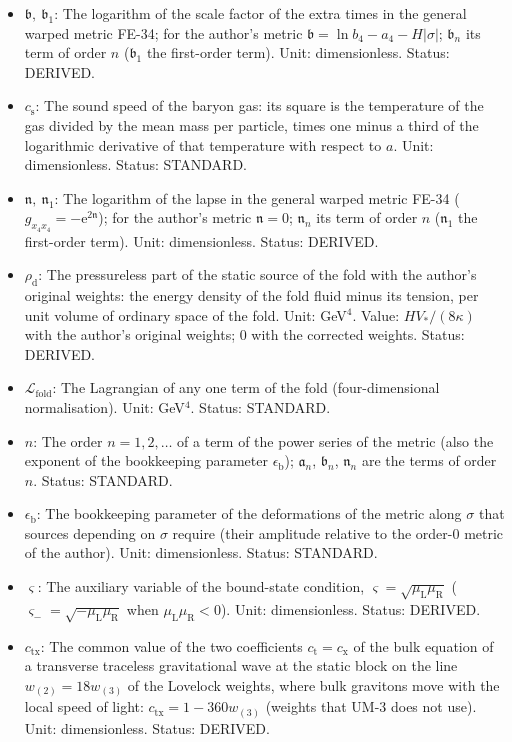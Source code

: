 \documentclass[
  10pt,
]{article}
\begin{document}
\begin{itemize}
  \(\mathfrak{a} = a_4 - H\lvert\sigma\rvert\); \(\mathfrak{a}_n\) its
  term of order \(n\) in the power series FE-35 (\(\mathfrak{a}_1\) the
  first-order term). Unit: dimensionless. Status: DERIVED.
\item
  \(\mathfrak{b},\ \mathfrak{b}_1\): The logarithm of the scale factor
  of the extra times in the general warped metric FE-34; for the
  author's metric
  \(\mathfrak{b} = \ln b_4 - a_4 - H\lvert\sigma\rvert\);
  \(\mathfrak{b}_n\) its term of order \(n\) (\(\mathfrak{b}_1\) the
  first-order term). Unit: dimensionless. Status: DERIVED.
\item
  \(c_{\mathrm{s}}\): The sound speed of the baryon gas: its square is
  the temperature of the gas divided by the mean mass per particle,
  times one minus a third of the logarithmic derivative of that
  temperature with respect to \(a\). Unit: dimensionless. Status:
  STANDARD.
\item
  \(\mathfrak{n},\ \mathfrak{n}_1\): The logarithm of the lapse in the
  general warped metric FE-34
  (\(g_{x_4x_4} = -\mathrm{e}^{2\mathfrak{n}}\)); for the author's
  metric \(\mathfrak{n} = 0\); \(\mathfrak{n}_n\) its term of order
  \(n\) (\(\mathfrak{n}_1\) the first-order term). Unit: dimensionless.
  Status: DERIVED.
\item
  \(\rho_{\mathrm{d}}\): The pressureless part of the static source of
  the fold with the author's original weights: the energy density of the
  fold fluid minus its tension, per unit volume of ordinary space of the
  fold. Unit: GeV\(^4\). Value: \(HV_*/(8\kappa)\) with the author's
  original weights; 0 with the corrected weights. Status: DERIVED.
\item
  \(\mathcal{L}_{\mathrm{fold}}\): The Lagrangian of any one term of the
  fold (four-dimensional normalisation). Unit: GeV\(^4\). Status:
  STANDARD.
\item
  \(n\): The order \(n = 1, 2, \dots\) of a term of the power series of
  the metric (also the exponent of the bookkeeping parameter
  \(\epsilon_{\mathrm{b}}\)); \(\mathfrak{a}_n\), \(\mathfrak{b}_n\),
  \(\mathfrak{n}_n\) are the terms of order \(n\). Status: STANDARD.
\item
  \(\epsilon_{\mathrm{b}}\): The bookkeeping parameter of the
  deformations of the metric along \(\sigma\) that sources depending on
  \(\sigma\) require (their amplitude relative to the order-0 metric of
  the author). Unit: dimensionless. Status: STANDARD.
\item
  \(\varsigma\): The auxiliary variable of the bound-state condition,
  \(\varsigma = \sqrt{\mu_{\mathrm{L}}\mu_{\mathrm{R}}}\)
  (\(\varsigma_- = \sqrt{-\mu_{\mathrm{L}}\mu_{\mathrm{R}}}\) when
  \(\mu_{\mathrm{L}}\mu_{\mathrm{R}} < 0\)). Unit: dimensionless.
  Status: DERIVED.
\item
  \(c_{\mathrm{tx}}\): The common value of the two coefficients
  \(c_{\mathrm{t}} = c_{\mathrm{x}}\) of the bulk equation of a
  transverse traceless gravitational wave at the static block on the
  line \(w_{(2)} = 18w_{(3)}\) of the Lovelock weights, where bulk
  gravitons move with the local speed of light:
  \(c_{\mathrm{tx}} = 1 - 360w_{(3)}\) (weights that UM-3 does not use).
  Unit: dimensionless. Status: DERIVED.
\end{itemize}
\end{document}
